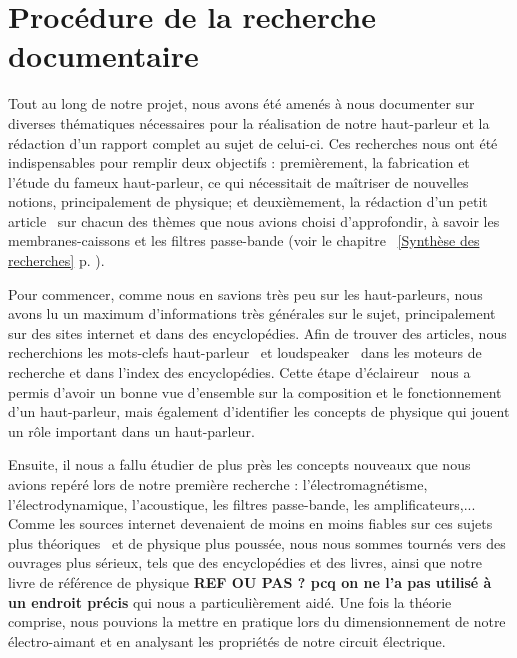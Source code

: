\section{Procédure de la recherche documentaire} 
\label{sec:app/demarche}

Tout au long de notre projet, nous avons été amenés à nous documenter sur diverses thématiques nécessaires pour la réalisation de notre haut-parleur et la rédaction d'un rapport complet au sujet de celui-ci.
Ces recherches nous ont été indispensables pour remplir deux objectifs : premièrement, la fabrication et l'étude du fameux haut-parleur, ce qui nécessitait de maîtriser de nouvelles notions, principalement de physique; et deuxièmement, la rédaction d'un petit \og article \fg\ sur chacun des thèmes que nous avions choisi d'approfondir, à savoir les membranes-caissons et les filtres passe-bande (voir le chapitre ~\ref{Synthèse des recherches} p. \pageref{Synthèse des recherches}).
\newline

Pour commencer, comme nous en savions très peu sur les haut-parleurs, nous avons lu un maximum d’informations très générales sur le sujet, principalement sur des sites internet et dans des encyclopédies. Afin de trouver des articles, nous recherchions les mots-clefs \og haut-parleur \fg\ et \og loudspeaker \fg\ dans les moteurs de recherche et dans l'index des encyclopédies. 
Cette étape \og d'éclaireur \fg\ nous a permis d'avoir un bonne vue d’ensemble sur la composition et le fonctionnement d’un haut-parleur, mais également d'identifier les concepts de physique qui jouent un rôle important dans un haut-parleur.  

Ensuite, il nous a fallu étudier de plus près les concepts nouveaux que nous avions repéré lors de notre première recherche : l'électromagnétisme, l'électrodynamique, l’acoustique, les filtres passe-bande, les amplificateurs,... Comme les sources internet devenaient de moins en moins fiables sur ces sujets plus \og théoriques \fg\ et de physique plus poussée, nous nous sommes tournés vers des ouvrages plus sérieux, tels que des encyclopédies et des livres, ainsi que notre livre de référence de physique \cite{Pearson}\textbf{REF OU PAS ? pcq on ne l'a pas utilisé à un endroit précis} %
qui nous a particulièrement aidé. Une fois la théorie comprise, nous pouvions la mettre en pratique lors du dimensionnement de notre électro-aimant et en analysant les propriétés de notre circuit électrique. 
\newline

